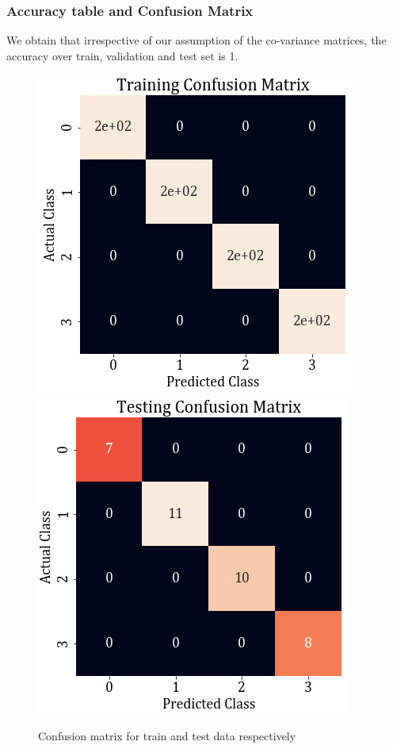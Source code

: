 \documentclass[11pt,a4paper]{article}
\begin{document}
\subsubsection{Accuracy table and Confusion Matrix}
We obtain that irrespective of our assumption of the co-variance matrices, the accuracy over train, validation and test set is 1. 


\begin{figure}[H]
    \centering
    \includegraphics[scale=0.55]{images/1A/1A_cm_nb_train.png}
    \includegraphics[scale=0.55]{images/1A/1A_cm_nb_test.png}
    \caption{Confusion matrix for train and test data respectively}
    \label{fig:conf_mats}
\end{figure}
\end{document}
